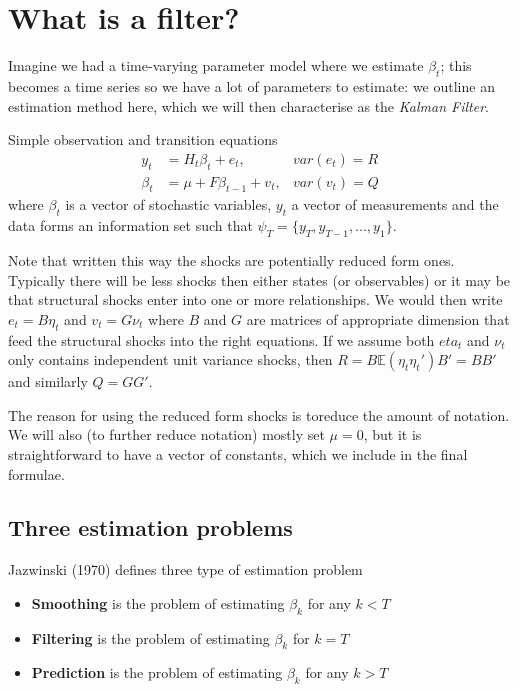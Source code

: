\documentclass[
  letterpaper,
]{book}
\providecommand{\tightlist}{%
  \setlength{\itemsep}{0pt}\setlength{\parskip}{0pt}}\usepackage{longtable,booktabs,array}
\begin{document}
\hypertarget{what-is-a-filter}{%
\section{What is a filter?}\label{what-is-a-filter}}

Imagine we had a time-varying parameter model where we estimate
\(\beta_t\); this becomes a time series so we have a lot of parameters
to estimate: we outline an estimation method here, which we will then
characterise as the \emph{Kalman Filter}.

Simple observation and transition equations \begin{align}
y_t     &= H_t\beta_t + e_t, &var(e_t) = R \\
\beta_t &= \mu + F \beta_{t-1} + v_t, &var(v_t)=Q
\end{align} where \(\beta_t\) is a vector of stochastic variables,
\(y_t\) a vector of measurements and the data forms an information set
such that \(\psi_T = \{y_T,y_{T-1},...,y_1\}\).

Note that written this way the shocks are potentially reduced form ones.
Typically there will be less shocks then either states (or observables)
or it may be that structural shocks enter into one or more
relationships. We would then write \(e_t = B\eta_t\) and
\(v_t = G\nu_t\) where \(B\) and \(G\) are matrices of appropriate
dimension that feed the structural shocks into the right equations. If
we assume both \(eta_t\) and \(\nu_t\) only contains independent unit
variance shocks, then \(R = B\mathbb{E}(\eta_t\eta_t')B' = BB'\) and
similarly \(Q=GG'\).

The reason for using the reduced form shocks is toreduce the amount of
notation. We will also (to further reduce notation) mostly set
\(\mu = 0\), but it is straightforward to have a vector of constants,
which we include in the final formulae.

\hypertarget{three-estimation-problems}{%
\subsection{Three estimation problems}\label{three-estimation-problems}}

Jazwinski (1970) defines three type of estimation problem

\begin{itemize}
\tightlist
\item
  \textbf{Smoothing} is the problem of estimating \(\beta_k\) for any
  \(k<T\)
\item
  \textbf{Filtering} is the problem of estimating \(\beta_k\) for
  \(k=T\)
\item
  \textbf{Prediction} is the problem of estimating \(\beta_k\) for any
  \(k>T\)
\end{itemize}
\end{document}
